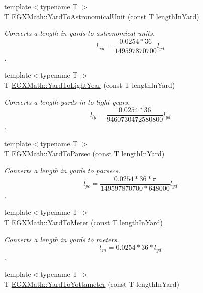 \begin{DoxyCompactItemize}
\item 
{\footnotesize template$<$typename T $>$ }\\T \mbox{\hyperlink{group___e_g_x_math-_conversions-_length_conversions-_imperial-_yard-_astronomical_gae62795f30f07c62e0082725518bc0369}{E\+G\+X\+Math\+::\+Yard\+To\+Astronomical\+Unit}} (const T length\+In\+Yard)
\begin{DoxyCompactList}\small\item\em Converts a length in yards to astronomical units. \[ l_{au}=\frac{0.0254 * 36}{149597870700} l_{yd} \]. \end{DoxyCompactList}\item 
{\footnotesize template$<$typename T $>$ }\\T \mbox{\hyperlink{group___e_g_x_math-_conversions-_length_conversions-_imperial-_yard-_astronomical_ga7e91cb1696861e32c239712c901f369f}{E\+G\+X\+Math\+::\+Yard\+To\+Light\+Year}} (const T length\+In\+Yard)
\begin{DoxyCompactList}\small\item\em Converts a length yards in to light-\/years. \[ l_{ly}=\frac{0.0254 * 36}{9460730472580800} l_{yd} \]. \end{DoxyCompactList}\item 
{\footnotesize template$<$typename T $>$ }\\T \mbox{\hyperlink{group___e_g_x_math-_conversions-_length_conversions-_imperial-_yard-_astronomical_ga23f43ac2cd611de8ead9af1772607dd8}{E\+G\+X\+Math\+::\+Yard\+To\+Parsec}} (const T length\+In\+Yard)
\begin{DoxyCompactList}\small\item\em Converts a length in yards to parsecs. \[ l_{pc}=\frac{0.0254 * 36 * \pi}{149597870700 * 648000} l_{yd} \]. \end{DoxyCompactList}\item 
{\footnotesize template$<$typename T $>$ }\\T \mbox{\hyperlink{group___e_g_x_math-_conversions-_length_conversions-_imperial-_yard-_s_i_gadd64039dca326950457e402fc0695083}{E\+G\+X\+Math\+::\+Yard\+To\+Meter}} (const T length\+In\+Yard)
\begin{DoxyCompactList}\small\item\em Converts a length in yards to meters. \[ l_{m}=0.0254 * 36 * l_{yd} \]. \end{DoxyCompactList}\item 
{\footnotesize template$<$typename T $>$ }\\T \mbox{\hyperlink{group___e_g_x_math-_conversions-_length_conversions-_imperial-_yard-_s_i_ga746a9edfd1cf2828e2fa0d9dfccc22fd}{E\+G\+X\+Math\+::\+Yard\+To\+Yottameter}} (const T length\+In\+Yard)

\end{DoxyCompactItemize}
